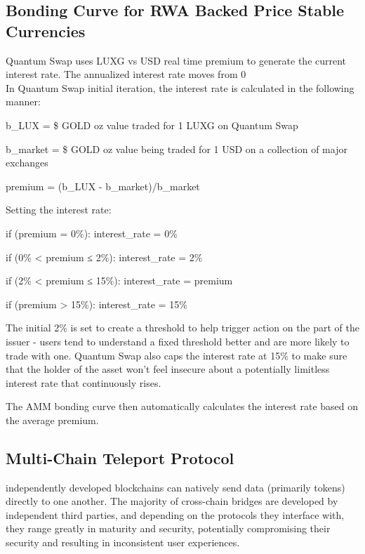 \documentclass[11pt]{article}
\begin{document}
\subsection{Bonding Curve for RWA Backed Price Stable Currencies}

Quantum Swap uses LUXG vs USD real time premium to generate the current interest rate. The annualized interest rate moves from 0\\%


In Quantum Swap initial iteration, the interest rate is calculated in the following manner:


b\_LUX = \$ GOLD oz value traded for 1 LUXG on Quantum Swap


b\_market = \$ GOLD oz value being traded for 1 USD on a collection of major exchanges


premium = (b\_LUX - b\_market)/b\_market


Setting the interest rate:


if (premium = 0\%): interest\_rate = 0\%


if (0\% < premium ≤ 2\%): interest\_rate = 2\%


if (2\% < premium ≤ 15\%): interest\_rate = premium


if (premium > 15\%): interest\_rate = 15\%


The initial 2\% is set to create a threshold to help trigger action on the part of the issuer - users tend to understand a fixed threshold better and are more likely to trade with one. Quantum Swap also caps the interest rate at 15\% to make sure that the holder of the asset won't feel insecure about a potentially limitless interest rate that continuously rises.


The AMM bonding curve then automatically calculates the interest rate based on the average premium.


\subsection{Multi-Chain Teleport Protocol}

independently developed blockchains can natively send data (primarily tokens) directly to one another. The majority of cross-chain bridges are developed by independent third parties, and depending on the protocols they interface with, they range greatly in maturity and security, potentially compromising their security and resulting in inconsistent user experiences.
\end{document}
